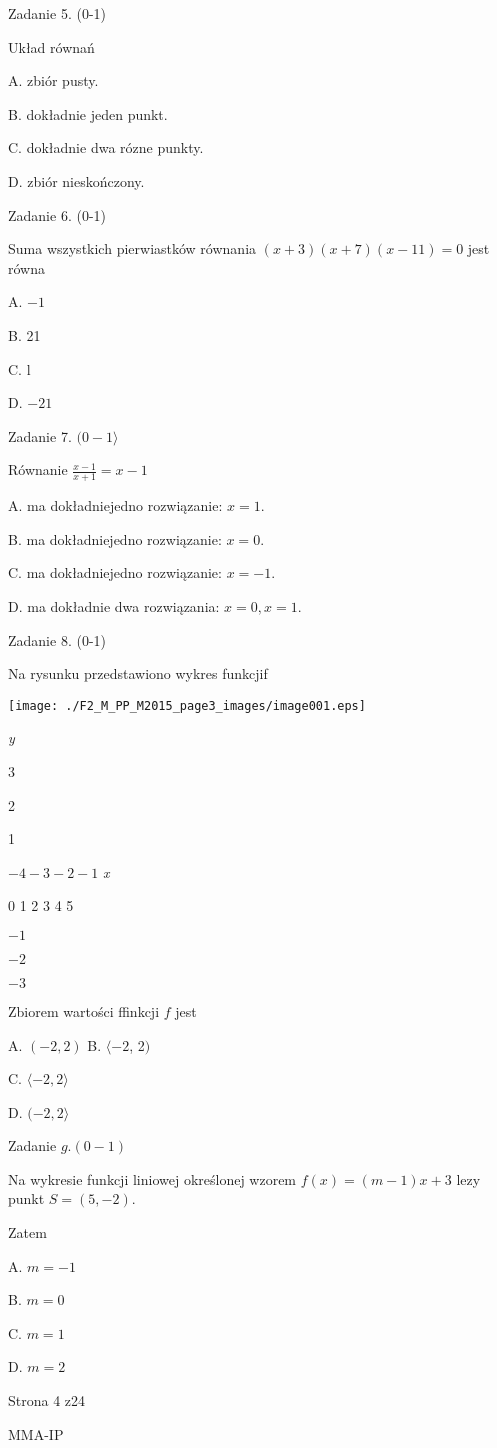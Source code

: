 \documentclass[a4paper,12pt]{article}
\begin{document}
Zadanie 5. (0-1)

Układ równań 

A. zbiór pusty.

B. dokładnie jeden punkt.

C. dokładnie dwa rózne punkty.

D. zbiór nieskończony.

Zadanie 6. (0-1)

Suma wszystkich pierwiastków równania $(x+3)(x+7)(x-11)=0$ jest równa

A. $-1$

B. 21

C. l

D. $-21$

Zadanie 7. $(0-1\rangle$

Równanie $\displaystyle \frac{x-1}{x+1}=x-1$

A. ma dokładniejedno rozwiązanie: $x=1.$

B. ma dokładniejedno rozwiązanie: $x=0.$

C. ma dokładniejedno rozwiązanie: $x=-1.$

D. ma dokładnie dwa rozwiązania: $x=0, x=1.$

Zadanie 8. (0-1)

Na rysunku przedstawiono wykres funkcjif
\begin{center}
\texttt{[image: ./F2\_M\_PP\_M2015\_page3\_images/image001.eps]}
\end{center}
{\it y}

3

2

1

$-4 -3  -2 -1$  {\it x}

0  1 2 3 4  5

$-1$

$-2$

$-3$

Zbiorem wartości ffinkcji $f$ jest

A. $(-2,2)$ B. $\langle-2$, 2$)$

C. $\langle-2,  2\rangle$

D. $(-2,2\rangle$

Zadanie $g. (0-1)$

Na wykresie funkcji liniowej określonej wzorem $f(x)=(m-1)x+3$ lezy punkt $S=(5,-2).$

Zatem

A. $m=-1$

B. $m=0$

C. $m=1$

D. $m=2$

Strona 4 z24

MMA-IP
\end{document}
